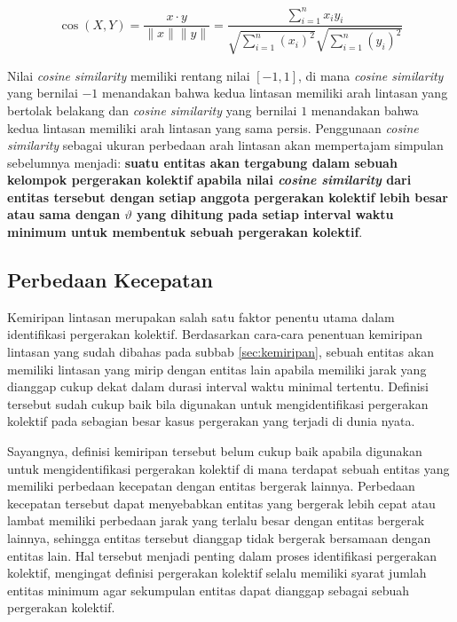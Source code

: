 \begin{equation}
    \cos (X, Y)= \frac{x \cdot y}{\|x\| \|y\|} = \frac{ \sum_{i=1}^{n}{x_i y_i}}{ \sqrt{\sum_{i=1}^{n}{(x_i)^2}} \sqrt{\sum_{i=1}^{n}{( y_i)^2}} }
    \label{bab3:cosine-similarity}
\end{equation}

Nilai \textit{cosine similarity} memiliki rentang nilai $[-1, 1]$, di mana \textit{cosine similarity} yang bernilai $-1$ menandakan bahwa kedua lintasan memiliki arah lintasan yang bertolak belakang dan \textit{cosine similarity} yang bernilai $1$ menandakan bahwa kedua lintasan memiliki arah lintasan yang sama persis. Penggunaan \textit{cosine similarity} sebagai ukuran perbedaan arah lintasan akan mempertajam simpulan sebelumnya menjadi: \textbf{suatu entitas akan tergabung dalam sebuah kelompok pergerakan kolektif apabila nilai \textit{cosine similarity} dari entitas tersebut dengan setiap anggota pergerakan kolektif lebih besar atau sama dengan $\vartheta$ yang dihitung pada setiap interval waktu minimum untuk membentuk sebuah pergerakan kolektif}.
    
\subsection{Perbedaan Kecepatan}
\label{subsec:beda-kecepatan}
    
Kemiripan lintasan merupakan salah satu faktor penentu utama dalam identifikasi pergerakan kolektif. Berdasarkan cara-cara penentuan kemiripan lintasan yang sudah dibahas pada subbab \ref{sec:kemiripan}, sebuah entitas akan memiliki lintasan yang mirip dengan entitas lain apabila memiliki jarak yang dianggap cukup dekat dalam durasi interval waktu minimal tertentu. Definisi tersebut sudah cukup baik bila digunakan untuk mengidentifikasi pergerakan kolektif pada sebagian besar kasus pergerakan yang terjadi di dunia nyata.

Sayangnya, definisi kemiripan tersebut belum cukup baik apabila digunakan untuk mengidentifikasi pergerakan kolektif di mana terdapat sebuah entitas yang memiliki perbedaan kecepatan dengan entitas bergerak lainnya. Perbedaan kecepatan tersebut dapat menyebabkan entitas yang bergerak lebih cepat atau lambat memiliki perbedaan jarak yang terlalu besar dengan entitas bergerak lainnya, sehingga entitas tersebut dianggap tidak bergerak bersamaan dengan entitas lain. Hal tersebut menjadi penting dalam proses identifikasi pergerakan kolektif, mengingat definisi pergerakan kolektif selalu memiliki syarat jumlah entitas minimum agar sekumpulan entitas dapat dianggap sebagai sebuah pergerakan kolektif.
    

